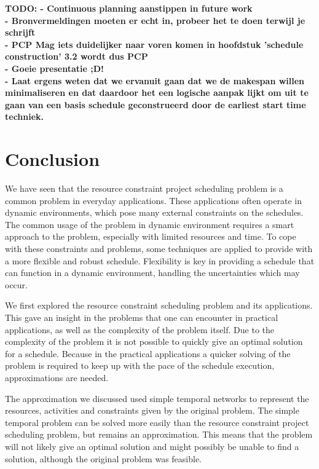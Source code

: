 \documentclass{article}
\theoremstyle{definition}
\newcommand{\TODO}[1]{{\color{red}\textbf{TODO: #1}}}
\begin{document}
\newpage

\TODO{
 - Continuous planning aanstippen in future work \\
 - Bronvermeldingen moeten er echt in, probeer het te doen terwijl je schrijft \\
 - PCP Mag iets duidelijker naar voren komen in hoofdstuk 'schedule construction' 3.2 wordt dus PCP \\
 - Goeie presentatie ;D! \\
 - Laat ergens weten dat we ervanuit gaan dat we de makespan willen minimaliseren en dat daardoor het een logische aanpak lijkt om uit te gaan van een basis schedule geconstrueerd door de earliest start time techniek. \\
 }

\newpage
 
\section{Conclusion}

We have seen that the resource constraint project scheduling problem is a common problem in everyday applications.
These applications often operate in dynamic environments, which pose many external constraints on the schedules.
The common usage of the problem in dynamic environment requires a smart approach to the problem, especially with limited resources and time.
To cope with these constraints and problems, some techniques are applied to provide with a more flexible and robust schedule.
Flexibility is key in providing a schedule that can function in a dynamic environment, handling the uncertainties which may occur.

We first explored the resource constraint scheduling problem and its applications.
This gave an insight in the problems that one can encounter in practical applications, as well as the complexity of the problem itself.
Due to the complexity of the problem it is not possible to quickly give an optimal solution for a schedule.
Because in the practical applications a quicker solving of the problem is required to keep up with the pace of the schedule execution, approximations are needed.

The approximation we discussed used simple temporal networks to represent the resources, activities and constraints given by the original problem.
The simple temporal problem can be solved more easily than the resource constraint project scheduling problem, but remains an approximation.
This means that the problem will not likely give an optimal solution and might possibly be unable to find a solution, although the original problem was feasible.
\end{document}
